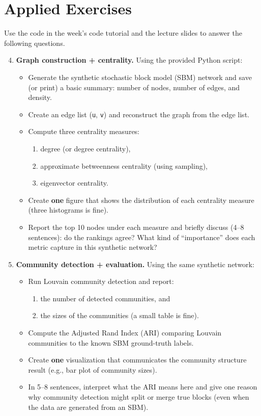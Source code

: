 \documentclass[11pt]{article}
\begin{document}
\section*{Applied Exercises}
Use the code in the week's code tutorial and the lecture slides to answer the following questions.\bigskip

  \begin{enumerate}
\setcounter{enumi}{3}

\item \textbf{Graph construction + centrality.}
Using the provided Python script:
\begin{itemize}
  \item Generate the synthetic stochastic block model (SBM) network and save (or print) a basic summary: number of nodes, number of edges, and density.
  \item Create an edge list (\texttt{u}, \texttt{v}) and reconstruct the graph from the edge list.
  \item Compute three centrality measures:
  \begin{enumerate}
    \item degree (or degree centrality),
    \item approximate betweenness centrality (using sampling),
    \item eigenvector centrality.
  \end{enumerate}
  \item Create \textbf{one} figure that shows the distribution of each centrality measure (three histograms is fine).
  \item Report the top 10 nodes under each measure and briefly discuss (4--8 sentences): do the rankings agree? What kind of ``importance'' does each metric capture in this synthetic network?
\end{itemize}

\item \textbf{Community detection + evaluation.}
Using the same synthetic network:
\begin{itemize}
  \item Run Louvain community detection and report:
  \begin{enumerate}
    \item the number of detected communities, and
    \item the sizes of the communities (a small table is fine).
  \end{enumerate}
  \item Compute the Adjusted Rand Index (ARI) comparing Louvain communities to the known SBM ground-truth labels.
  \item Create \textbf{one} visualization that communicates the community structure result (e.g., bar plot of community sizes).
  \item In 5--8 sentences, interpret what the ARI means here and give one reason why community detection might split or merge true blocks (even when the data are generated from an SBM).
\end{itemize}


\end{enumerate}
\end{document}
